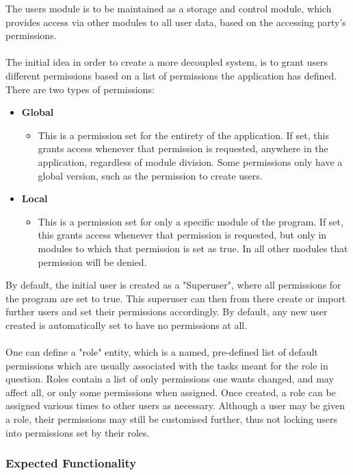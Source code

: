 \documentclass[12pt]{article}
\begin{document}
		The users module is to be maintained as a storage and control module, which provides access via other modules to all user data, based on the accessing party's permissions.\\\\	
		The initial idea in order to create a more decoupled system, is to grant users different permissions based on a list of permissions the application has defined. There are two types of permissions:
		\begin{itemize}
			\item \textbf{Global}
			\begin{itemize}
				\item This is a permission set for the entirety of the application. If set, this grants access whenever that permission is requested, anywhere in the application, regardless of module division. Some permissions only have a global version, such as the permission to create users.
			\end{itemize}
			\item \textbf{Local}
			\begin{itemize}
				\item This is a permission set for only a specific module of the program. If set, this grants access whenever that permission is requested, but only in modules to which that permission is set as true. In all other modules that permission will be denied.
			\end{itemize}
		\end{itemize}
		By default, the initial user is created as a "Superuser", where all permissions for the program are set to true. This superuser can then from there create or import further users and set their permissions accordingly. By default, any new user created is automatically set to have no permissions at all.\\\\
		One can define a "role" entity, which is a named, pre-defined list of default permissions which are usually associated with the tasks meant for the role in question. Roles contain a list of only permissions one wants changed, and may affect all, or only some permissions when assigned. Once created, a role can be assigned various times to other users as necessary. Although a user may be given a role, their permissions may still be customised further, thus not locking users into permissions set by their roles.
		
		\subsubsection{Expected Functionality}
		
\end{document}
